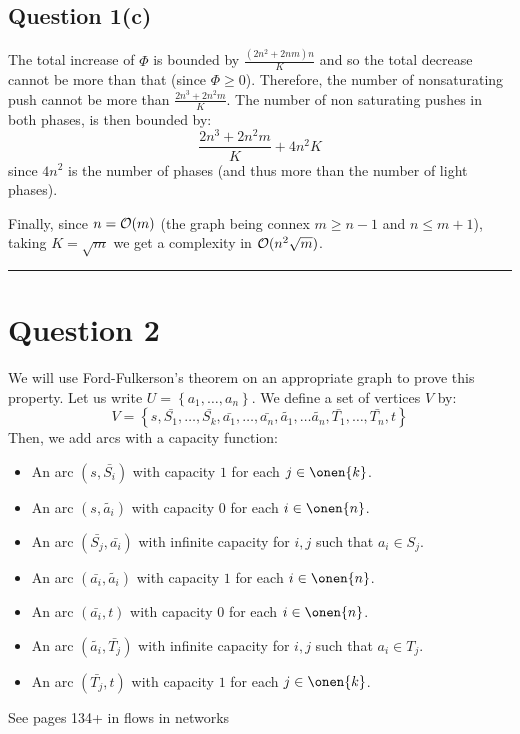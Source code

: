 \documentclass[math]{cours}
\begin{document}
\subsection{Question 1(c)}
The total increase of $\Phi$ is bounded by $\frac{(2n^{2} + 2nm)n}{K}$ and so the total decrease cannot be more than that (since $\Phi \geq 0$).
Therefore, the number of nonsaturating push cannot be more than $\frac{2n^{3} + 2n^{2}m}{K}$.
The number of non saturating pushes in both phases, is then bounded by:
\begin{equation*}
	\frac{2n^{3} + 2n^{2}m}{K} + 4n^{2}K
\end{equation*}
since $4n^{2}$ is the number of phases (and thus more than the number of light phases).

Finally, since $n = \mathcal{O}(m)$ (the graph being connex $m \geq n - 1$ and $n \leq m + 1$), taking $K = \sqrt{m}$ we get a complexity in $\mathcal{O}(n^{2}\sqrt{m})$.

\hrule

\section{Question 2}
We will use Ford-Fulkerson's theorem on an appropriate graph to prove this property.
Let us write $U = \left\{a_{1}, \ldots, a_{n} \right\}$.
We define a set of vertices $V$ by:
\begin{equation*}
	V = \left\{s, \bar{S_{1}}, \ldots, \bar{S_{k}}, \bar{a_{1}}, \ldots, \bar{a_{n}}, \tilde{a_{1}}, \ldots \tilde{a_{n}}, \bar{T_{1}}, \ldots, \bar{T_{n}}, t\right\}
\end{equation*}
Then, we add arcs with a capacity function:
\begin{itemize}
	\item An arc $(s, \bar{S_{i}})$ with capacity $1$ for each $j \in \onen{k}$.
	\item An arc $(s, \tilde{a_{i}})$ with capacity $0$ for each $i \in \onen{n}$.
	\item An arc $(\bar{S_{j}}, \bar{a_{i}})$ with infinite capacity for $i, j$ such that $a_{i} \in S_{j}$.
	\item An arc $(\bar{a_{i}}, \tilde{a_{i}})$ with capacity $1$ for each $i \in \onen{n}$.
	\item An arc $(\bar{a_{i}}, t)$ with capacity $0$ for each $i \in \onen{n}$.
	\item An arc $(\tilde{a_{i}}, \bar{T_{j}})$ with infinite capacity for $i, j$ such that $a_{i} \in T_{j}$.
	\item An arc $(\bar{T_{j}}, t)$ with capacity $1$ for each $j\in \onen{k}$.
\end{itemize}

See pages 134+ in flows in networks
\end{document}

